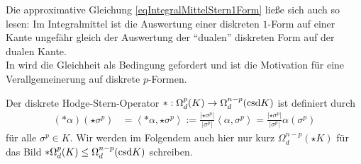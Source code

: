   Die approximative Gleichung \eqref{eqIntegralMittelStern1Form} ließe sich auch so lesen: 
  Im Integralmittel ist die Auswertung einer diskreten \( 1 \)-Form auf einer Kante ungefähr gleich der Auswertung der "`dualen"' diskreten Form auf der dualen Kante.\\
  In \cite{desbrun} wird die Gleichheit als Bedingung gefordert und ist die Motivation für eine Verallgemeinerung auf diskrete \( p \)-Formen. 

  \begin{definition}
    \label{defDiskreteHodgeStern}
    Der diskrete Hodge-Stern-Operator \( *:\Omega_{d}^{p}(K)\rightarrow\Omega_{d}^{n-p}(\text{csd} K) \) ist definiert durch
    \begin{align}
      (*\alpha)(\star\sigma^{p}) &= \left\langle *\alpha, \star\sigma^{p} \right\rangle 
                                        := \frac{|\star\sigma^{p}|}{|\sigma^{p}|} \left\langle \alpha, \sigma^{p} \right\rangle
                                         = \frac{|\star\sigma^{p}|}{|\sigma^{p}|} \alpha(\sigma^{p})
    \end{align}
    für alle \( \sigma^{p}\in K \).
    Wir werden im Folgendem auch hier nur kurz \( \Omega_{d}^{n-p}(\star K)\) für das Bild \( *\Omega_{d}^{p}(K)\le \Omega_{d}^{n-p}(\text{csd} K)\) schreiben.
  \end{definition}

